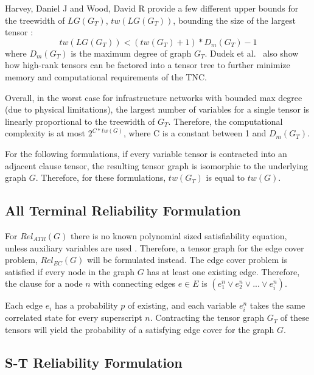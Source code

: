 \documentclass[12pt,twocolumn]{article}
\begin{document}
Harvey, Daniel J and Wood, David R provide a few different upper bounds for the treewidth of \(LG(G_T)\), \(tw(LG(G_T))\), bounding the size of the largest tensor \cite{harvey2018treewidth}: \begin{equation*}
tw(LG(G_T))<(tw(G_T)+1)*D_m(G_T)-1
\end{equation*} where \(D_m(G_T)\) is the maximum degree of graph \(G_T\). Dudek et al.~\cite{dudek2019efficient} also show how high-rank tensors can be factored into a tensor tree to further minimize memory and computational requirements of the TNC.

Overall, in the worst case for infrastructure networks with bounded max degree (due to physical limitations), the largest number of variables for a single tensor is linearly proportional to the treewidth of \(G_T\). Therefore, the computational complexity is at most \(2^{C*tw(G)}\), where C is a constant between 1 and \(D_m(G_T)\).

For the following formulations, if every variable tensor is contracted into an adjacent clause tensor, the resulting tensor graph is isomorphic to the underlying graph \(G\). Therefore, for these formulations, \(tw(G_T)\) is equal to \(tw(G)\).

\hypertarget{all-terminal-reliability-formulation}{%
\subsection{All Terminal Reliability Formulation}\label{all-terminal-reliability-formulation}}

For \(Rel_{ATR}(G)\) there is no known polynomial sized satisfiability equation, unless auxiliary variables are used \cite{paredes2019principled}. Therefore, a tensor graph for the edge cover problem, \(Rel_{EC}(G)\) will be formulated instead. The edge cover problem is satisfied if every node in the graph \(G\) has at least one existing edge. Therefore, the clause for a node \(n\) with connecting edges \(e \in E\) is \((e_1^n \lor e_2^n \lor ... \lor e_i^n)\).

Each edge \(e_i\) has a probability \(p\) of existing, and each variable \(e_i^n\) takes the same correlated state for every superscript \(n\). Contracting the tensor graph \(G_T\) of these tensors will yield the probability of a satisfying edge cover for the graph \(G\).

\hypertarget{s-t-reliability-formulation}{%
\subsection{S-T Reliability Formulation}\label{s-t-reliability-formulation}}
\end{document}
